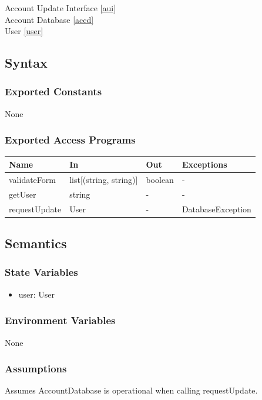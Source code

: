 \documentclass[12pt, titlepage]{article}
\begin{document}
Account Update Interface \ref{aui}\\
Account Database \ref{accd} \\
User \ref{user} \\

\subsection{Syntax}

\subsubsection{Exported Constants}
None
\subsubsection{Exported Access Programs}

\begin{center}
\begin{tabular}{p{3cm} p{4cm} p{4cm} p{2cm}}
\hline
\textbf{Name} & \textbf{In} & \textbf{Out} & \textbf{Exceptions} \\
\hline
validateForm & list[(string, string)] & boolean & - \\
getUser & string & - & - \\
requestUpdate & User & - & DatabaseException \\
\hline
\end{tabular}
\end{center}

\subsection{Semantics}

\subsubsection{State Variables}
\begin{itemize}
    \item user: User
\end{itemize}

\subsubsection{Environment Variables}
None

\subsubsection{Assumptions}
Assumes AccountDatabase is operational when calling requestUpdate.
\end{document}
